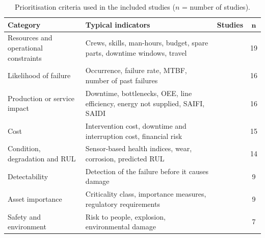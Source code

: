 \begin{table}[!htbp]
\centering
\caption{Prioritisation criteria used in the included studies ($n$ = number of studies).}
\label{tab:criteria-use}
\scriptsize
\begin{tabular}{|>{\raggedright\arraybackslash}p{2.3cm}|>{\raggedright\arraybackslash}p{3.6cm}|>{\raggedright\arraybackslash}p{3.9cm}|c|}
\hline
\textbf{Category} & \textbf{Typical indicators} & \textbf{Studies} & $\boldsymbol{n}$ \\
\hline
Resources and operational constraints & Crews, skills, man-hours, budget, spare parts, downtime windows, travel & \cite{ozcan2021,bulut2021,panwar2021,darko2026,rios2025,rios2024,schulze2022,enjavimadar2022,moradi2024,geng2022,woller2023,gao2024,wehbi2026,wittbrodt2026,danach2026,bi2022,li2027,zhou2024,dui2025} & 19 \\
\hline
Likelihood of failure & Occurrence, failure rate, MTBF, number of past failures & \cite{ozcan2021,bulut2021,delgado2026,panwar2021,bahadir2026,gopalakrishnan2022,rios2025,enjavimadar2022,moradi2024,qiu2026,hall2021,zhou2024,danach2026,astepe2021,darko2026,dui2026} & 16 \\
\hline
Production or service impact & Downtime, bottlenecks, OEE, line efficiency, energy not supplied, SAIFI, SAIDI & \cite{yang2021,gopalakrishnan2022,panwar2021,rios2025,wittbrodt2026,danach2026,geng2022,bahrami2021,enjavimadar2022,moradi2024,shaulagara2023,zhou2024,hedayatnia2025,hall2021,dui2025,dui2026} & 16 \\
\hline
Cost & Intervention cost, downtime and interruption cost, financial risk & \cite{darko2026,schulze2022,enjavimadar2022,moradi2024,geng2022,woller2023,wittbrodt2026,danach2026,zhou2024,bahadir2026,shaulagara2023,dui2025,dui2026,bahrami2021,wehbi2026} & 15 \\
\hline
Condition, degradation and RUL & Sensor-based health indices, wear, corrosion, predicted RUL & \cite{tang2026,darko2026,schulze2022,rios2024,geng2022,hedayatnia2025,wittbrodt2026,danach2026,dui2025,bi2022,shaulagara2023,zhou2024,rios2025,wehbi2026} & 14 \\
\hline
Detectability & Detection of the failure before it causes damage & \cite{ozcan2021,bulut2021,delgado2026,panwar2021,rios2025,enjavimadar2022,moradi2024,qiu2026,hall2021} & 9 \\
\hline
Asset importance & Criticality class, importance measures, regulatory requirements & \cite{astepe2021,rios2024,hedayatnia2025,dui2025,dui2026,wittbrodt2026,moradi2024,gao2024,geng2022} & 9 \\
\hline
Safety and environment & Risk to people, explosion, environmental damage & \cite{panwar2021,bahadir2026,rios2025,delgado2026,hall2021,shaulagara2023,enjavimadar2022} & 7 \\
\hline
\end{tabular}
\end{table}

